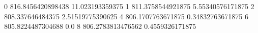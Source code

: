 0 816.8456420898438 11.023193359375
1 811.3758544921875 5.55340576171875
2 808.337646484375 2.51519775390625
4 806.1707763671875 0.34832763671875
6 805.8224487304688 0.0
8 806.2783813476562 0.4559326171875
